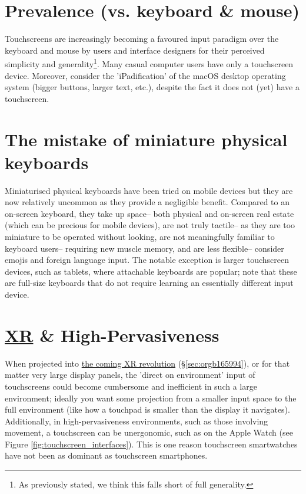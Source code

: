 \documentclass[logo,bsc,singlespacing,parskip]{infthesis}
\begin{document}
\section{Prevalence (vs. keyboard \& mouse)}
\label{sec:org6d663f8}
Touchscreens are increasingly becoming a favoured input paradigm over the keyboard and mouse by users and interface designers for their perceived simplicity and generality\footnote{As previously stated, we think this falls short of full generality.}.
Many casual computer users have only a touchscreen device.
Moreover, consider the 'iPadification' of the macOS desktop operating system (bigger buttons, larger text, etc.), despite the fact it does not (yet) have a touchscreen.

\section{The mistake of miniature physical keyboards}
\label{sec:org4b9bf3e}
Miniaturised physical keyboards have been tried on mobile devices but they are now relatively uncommon as they provide a negligible benefit.
Compared to an on-screen keyboard, they take up space-- both physical and on-screen real estate (which can be precious for mobile devices), are not truly tactile-- as they are too miniature to be operated without looking, are not meaningfully familiar to keyboard users-- requiring new muscle memory, and are less flexible-- consider emojis and foreign language input.
The notable exception is larger touchscreen devices, such as tablets, where attachable keyboards are popular; note that these are full-size keyboards that do not require learning an essentially different input device.

\section{\hyperref[org39cbd51]{XR} \& High-Pervasiveness}
\label{sec:org994f37d}
When projected into \hyperref[sec:orgb165994]{the coming XR revolution} (\S \ref{sec:orgb165994}), or for that matter very large display panels, the 'direct on environment' input of touchscreens could become cumbersome and inefficient in such a large environment; ideally you want some projection from a smaller input space to the full environment (like how a touchpad is smaller than the display it navigates).
Additionally, in high-pervasiveness environments, such as those involving movement, a touchscreen can be unergonomic, such as on the Apple Watch (see Figure \ref{fig:touchscreen_interfaces}).
This is one reason touchscreen smartwatches have not been as dominant as touchscreen smartphones.
\end{document}
